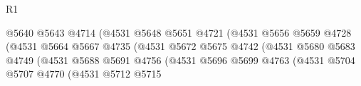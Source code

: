 \begin{lexlean}{R1}
\begin{coremodule}
                                                      @5640
                                                      @5643
                                                      @4714
                                                      (@4531
                                                        @5648
                                                        @5651
                                                        @4721
                                                        (@4531
                                                          @5656
                                                          @5659
                                                          @4728
                                                          (@4531
                                                            @5664
                                                            @5667
                                                            @4735
                                                            (@4531
                                                              @5672
                                                              @5675
                                                              @4742
                                                              (@4531
                                                                @5680
                                                                @5683
                                                                @4749
                                                                (@4531
                                                                  @5688
                                                                  @5691
                                                                  @4756
                                                                  (@4531
                                                                    @5696
                                                                    @5699
                                                                    @4763
                                                                    (@4531
                                                                      @5704
                                                                      @5707
                                                                      @4770
                                                                      (@4531
                                                                        @5712
                                                                        @5715

\end{coremodule}
\end{lexlean}
